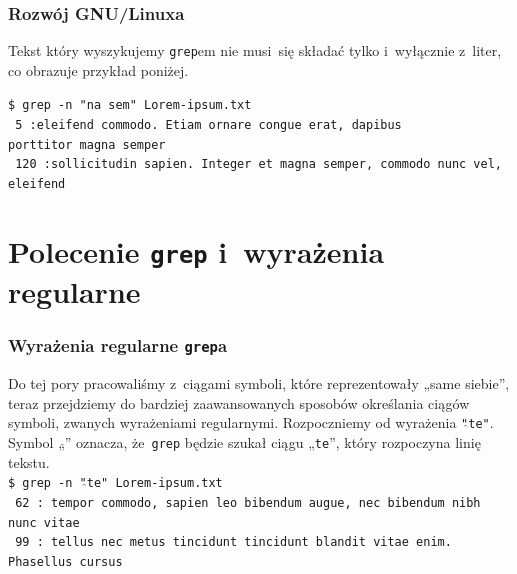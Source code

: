 \documentclass[10pt,t]{beamer}
\begin{document}
\begin{frame}
  \frametitle{Rozwój GNU/Linuxa}


  Tekst który wyszykujemy \texttt{grep}em nie musi~się składać tylko
  i~wyłącznie z~liter, co obrazuje przykład poniżej.

  \texttt{\$ grep -n "na sem"{} Lorem-ipsum.txt} \\
  \texttt{{\color{green} 5}{\color{jAxisBlue} :}eleifend commodo. Etiam
    ornare congue erat, dapibus} \\
  \texttt{porttitor mag{\color{red}na sem}per} \\
  \texttt{{\color{green} 120}{\color{jAxisBlue} :}sollicitudin sapien.
    Integer et mag{\color{red}na sem}per, commodo nunc vel, eleifend}

\end{frame}










\section{Polecenie \texttt{grep} i~wyrażenia regularne}


\begin{frame}
  \frametitle{Wyrażenia regularne \texttt{grep}a}


  Do tej pory pracowaliśmy z~ciągami symboli, które reprezentowały „same
  siebie”, teraz przejdziemy do bardziej zaawansowanych sposobów określania
  ciągów symboli, zwanych
  {wyrażeniami regularnymi}.
  Rozpoczniemy od wyrażenia
  \texttt{"\hspace{0.2em}$\hat{}$\hspace{0.2em}te"}. Symbol
  „\hspace{0.3em}$\hat{}$\hspace{0.3em}” oznacza, że~\texttt{grep} będzie
  szukał ciągu „\texttt{te}”, który rozpoczyna linię tekstu. \\
  \texttt{\$ grep -n "\hspace{0.2em}$\hat{}$\hspace{0.2em}te"{}
    Lorem-ipsum.txt} \\
  \texttt{{\color{green} 62}{\color{jAxisBlue} :}{\color{red} te}mpor
    commodo, sapien leo bibendum augue, nec bibendum nibh nunc vitae} \\
  \texttt{{\color{green} 99}{\color{jAxisBlue} :}{\color{red} te}llus nec
    metus tincidunt tincidunt blandit vitae enim. Phasellus cursus}

\end{frame}
\end{document}
